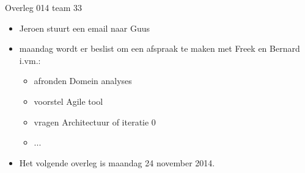 \documentclass{article}
\begin{document}
\begin{Minutes}{Overleg 014 team 33}
\begin{itemize}
\item Jeroen stuurt een email naar Guus
\item maandag wordt er beslist om een afspraak te maken met Freek en Bernard i.vm.:
\begin{itemize}
\item afronden Domein analyses
\item voorstel Agile tool
\item vragen Architectuur of iteratie 0
\item ...
\end{itemize}
 \item Het volgende overleg is maandag 24 november 2014. 
\end{itemize}


\end{Minutes}
\end{document}
